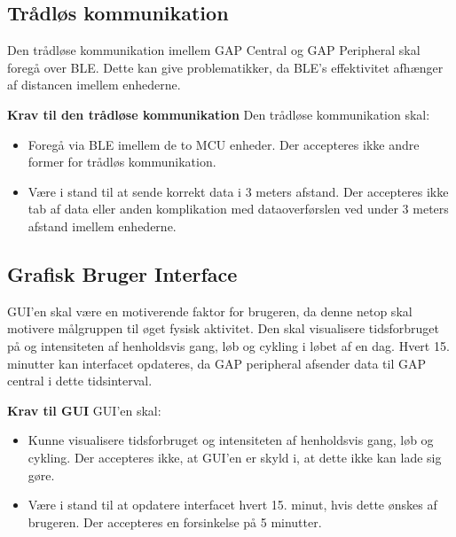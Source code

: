 \subsection{Trådløs kommunikation}
Den trådløse kommunikation imellem GAP Central og GAP Peripheral skal foregå over BLE. Dette kan give problematikker, da BLE's effektivitet afhænger af distancen imellem enhederne. 

\textbf{Krav til den trådløse kommunikation} \newline 
Den trådløse kommunikation skal:
\begin{itemize}
	\item Foregå via BLE imellem de to MCU enheder. Der accepteres ikke andre former for trådløs kommunikation.
	\item Være i stand til at sende korrekt data i 3 meters afstand. Der accepteres ikke tab af data eller anden komplikation med dataoverførslen ved under 3 meters afstand imellem enhederne.
\end{itemize}

\subsection{Grafisk Bruger Interface}
GUI'en skal være en motiverende faktor for brugeren, da denne netop skal motivere målgruppen til øget fysisk aktivitet. Den skal visualisere tidsforbruget på og intensiteten af henholdsvis gang, løb og cykling i løbet af en dag. Hvert 15. minutter kan interfacet opdateres, da GAP peripheral afsender data til GAP central i dette tidsinterval.

\textbf{Krav til GUI} \newline 
GUI'en skal:
\begin{itemize}
	\item Kunne visualisere tidsforbruget og intensiteten af henholdsvis gang, løb og cykling. Der accepteres ikke, at GUI'en er skyld i, at dette ikke kan lade sig gøre.
	\item Være i stand til at opdatere interfacet hvert 15. minut, hvis dette ønskes af brugeren. Der accepteres en forsinkelse på 5 minutter.
\end{itemize}

